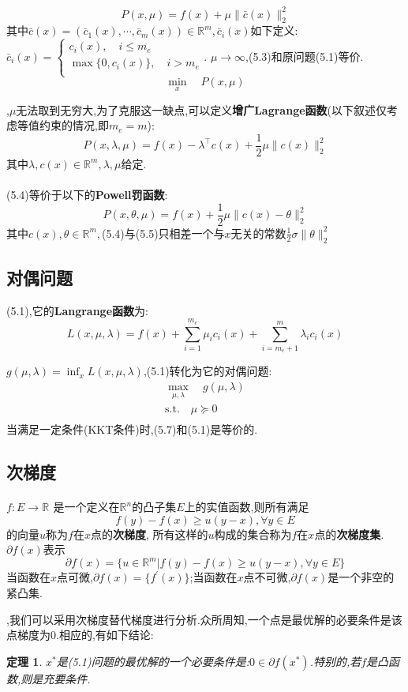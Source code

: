 \documentclass[UTF8]{ctexart}
\newtheorem{theo}{定理}[section]
\newcommand{\s}{\quad}
\renewcommand{\b}{\textbf}
\newcommand{\p}{\paragraph{}\s}
\newcommand{\ssect}{\subsection}
\newcommand{\equSplit}[1]{\begin{equation}\begin{split}#1\end{split}\end{equation}}
\newcommand{\equ}[1]{\begin{equation}#1\end{equation}}
\newcommand{\Tst}{\text{s.t.}\s}
\newcommand{\norm}[1]{\lVert#1\rVert}
\newcommand{\Real}[1]{\mathbb{R}^{#1}}
\numberwithin{equation}{section}
\begin{document}
		\equ{P(x,\mu)=f(x)+\mu \norm{\bar{c}(x)}^2_2}
		其中$\bar{c}(x)=(\bar{c}_1(x),\cdots,\bar{c}_m(x))\in\Real{m}$,$\,\bar{c}_i(x)$如下定义:
		$\bar{c}_i(x)=
		\begin{cases}
			c_i(x),\s i\leq m_e       \\
			\max\{0,c_i(x)\},\s i>m_e \\
		\end{cases}
		$.
		$\mu\rightarrow\infty$,(5.3)和原问题(5.1)等价.
		\equ{\min_x\s P(x,\mu)}

		,$\mu$无法取到无穷大,为了克服这一缺点,可以定义\b{增广Lagrange函数}(以下叙述仅考虑等值约束的情况,即$m_e=m$):
		\equ{P(x,\lambda,\mu)=f(x)-\lambda^\top c(x)+\frac{1}{2}\mu\norm{c(x)}^2_2}
		其中$\lambda,c(x)\in\Real{m},\lambda,\mu$给定.

		\p(5.4)等价于以下的\b{Powell罚函数}:
		\equ{P(x,\theta,\mu)=f(x)+\frac{1}{2}\mu\norm{c(x)-\theta}^2_2}
		其中$c(x),\theta\in\Real{m}$,\,(5.4)与(5.5)只相差一个与$x$无关的常数$\frac{1}{2}\sigma\norm{\theta}^2_2$

		\ssect{对偶问题}

		(5.1),它的\b{Langrange函数}为:
		\equ{L(x,\mu,\lambda)=f(x)+\sum^{m_e}_{i=1}\mu_ic_i(x)+\sum^{m}_{i=m_e+1}\lambda_ic_i(x)}

		$g(\mu,\lambda)=\inf_xL(x,\mu,\lambda)$,(5.1)转化为它的对偶问题:
		\equSplit{
			\max_{\mu,\lambda}\s g(\mu,\lambda)\\
			\Tst\mu\succeq0\\
		}
		当满足一定条件(KKT条件)时,(5.7)和(5.1)是等价的.

		\ssect{次梯度}

		\p$f:E\rightarrow\Real{}$
		是一个定义在$\Real{n}$的凸子集$E$上的实值函数,则所有满足
		\equ{f(y)-f(x)\geq u(y-x),\forall y\in E}
		的向量$u$称为$f$在$x$点的\b{次梯度},
		所有这样的$u$构成的集合称为$f$在$x$点的\b{次梯度集}.
		$\partial f(x)$表示
		\equ{\partial f(x)=\{u\in\Real{m}\vert f(y)-f(x)\geq u(y-x),\forall y\in E\}}
		当函数在$x$点可微,$\partial f(x)=\{f^\prime(x)\}$;当函数在$x$点不可微,$\partial f(x)$是一个非空的紧凸集.

		,我们可以采用次梯度替代梯度进行分析.众所周知,一个点是最优解的必要条件是该点梯度为0.相应的,有如下结论:
		\begin{theo}
			$x^*$是(5.1)问题的最优解的一个必要条件是:$0\in\partial f(x^*)$.特别的,若$f$是凸函数,则是充要条件.
		\end{theo}
\end{document}
